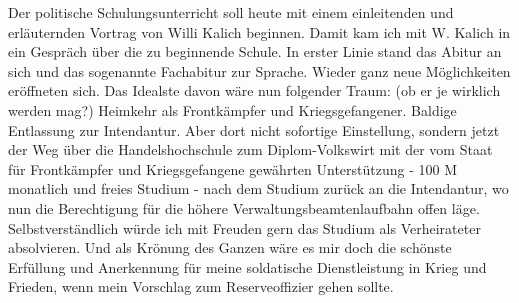 \def\day{16. November 1942 *}
\mktitle

Der politische Schulungsunterricht soll heute mit einem einleitenden und erl\"{a}uternden Vortrag von Willi Kalich beginnen.
Damit kam ich mit W. Kalich in ein Gespr\"{a}ch \"{u}ber die zu beginnende Schule.
In erster Linie stand das Abitur an sich und das sogenannte Fachabitur zur Sprache.
Wieder ganz neue M\"{o}glichkeiten er\"{o}ffneten sich.
Das Idealste davon w\"{a}re nun folgender Traum: (ob er je wirklich werden mag?) Heimkehr als Frontk\"{a}mpfer und Kriegsgefangener.
Baldige Entlassung zur Intendantur.
Aber dort nicht sofortige Einstellung, sondern jetzt der Weg \"{u}ber die Handelshochschule zum Diplom-Volkswirt mit der vom Staat f\"{u}r Frontk\"{a}mpfer und Kriegsgefangene gew\"{a}hrten Unterst\"{u}tzung - 100 M monatlich und freies Studium - nach dem Studium zur\"{u}ck an die Intendantur, wo nun die Berechtigung f\"{u}r die h\"{o}here Verwaltungsbeamtenlaufbahn offen l\"{a}ge.
Selbstverst\"{a}ndlich w\"{u}rde ich mit Freuden gern das Studium als Verheirateter absolvieren.
Und als Kr\"{o}nung des Ganzen w\"{a}re es mir doch die sch\"{o}nste Erf\"{u}llung und Anerkennung f\"{u}r meine soldatische Dienstleistung in Krieg und Frieden, wenn mein Vorschlag zum Reserveoffizier gehen sollte.

\clearpage
